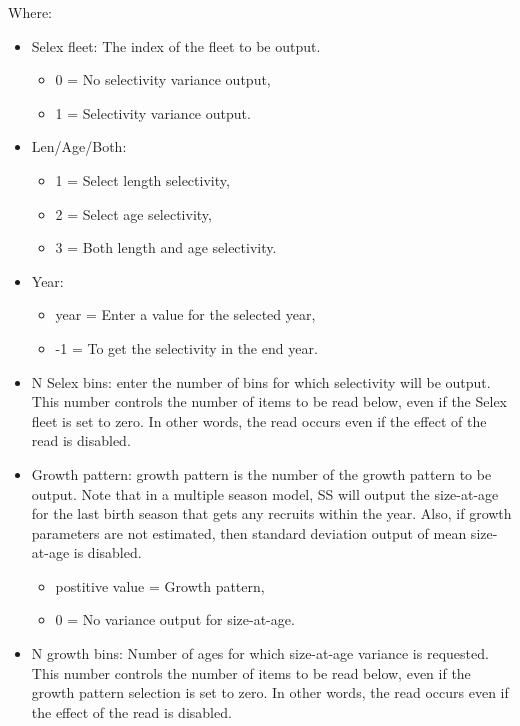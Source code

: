 Where:
\begin{itemize}
	\item Selex fleet:  The index of the fleet to be output. 
	\begin{itemize} 
		\item 0 = No selectivity variance output,
		\item 1 = Selectivity variance output.
	\end{itemize} 
	
	\item Len/Age/Both:  
	\begin{itemize}
		\item 1 = Select length selectivity, 
		\item 2 = Select age selectivity, 
		\item 3 = Both length and age selectivity.
	\end{itemize} 
	
	\item Year:  
	\begin{itemize}
		\item year = Enter a value for the selected year,
		\item -1  = To get the selectivity in the end year.
	\end{itemize} 

	\item 	N Selex bins:  enter the number of bins for which selectivity will be output.  This number controls the number of items to be read below, even if the Selex fleet is set to zero.  In other words, the read occurs even if the effect of the read is disabled. 
	
	\item Growth pattern:  growth pattern is the number of the growth pattern to be output. Note that in a multiple season model, SS will output the size-at-age for the last birth season that gets any recruits within the year.  Also, if growth parameters are not estimated, then standard deviation output of mean size-at-age is disabled. 
	\begin{itemize}
		\item postitive value = Growth pattern,
		\item 0 =  No variance output for size-at-age.   
	\end{itemize}

	\item 	N growth bins:  Number of ages for which size-at-age variance is requested.  This number controls the number of items to be read below, even if the growth pattern selection is set to zero.   In other words, the read occurs even if the effect of the read is disabled.
	

\end{itemize}
